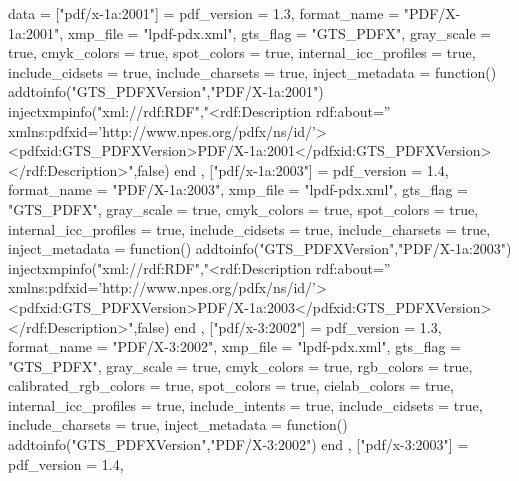 data = {
        ["pdf/x-1a:2001"] = 
        {
            pdf_version             = 1.3,
            format_name             = "PDF/X-1a:2001",
            xmp_file                = "lpdf-pdx.xml",
            gts_flag                = "GTS_PDFX",
            gray_scale              = true,
            cmyk_colors             = true,
            spot_colors             = true,
            internal_icc_profiles   = true,
            include_cidsets         = true,
            include_charsets        = true,
            inject_metadata         = function()
                addtoinfo("GTS_PDFXVersion","PDF/X-1a:2001")
                injectxmpinfo("xml://rdf:RDF","<rdf:Description rdf:about='' xmlns:pdfxid='http://www.npes.org/pdfx/ns/id/'><pdfxid:GTS_PDFXVersion>PDF/X-1a:2001</pdfxid:GTS_PDFXVersion></rdf:Description>",false)
            end
        },
        ["pdf/x-1a:2003"] = 
        {
            pdf_version             = 1.4,
            format_name             = "PDF/X-1a:2003",
            xmp_file                = "lpdf-pdx.xml",
            gts_flag                = "GTS_PDFX",
            gray_scale              = true,
            cmyk_colors             = true,
            spot_colors             = true,
            internal_icc_profiles   = true,
            include_cidsets         = true,
            include_charsets        = true,
            inject_metadata         = function()
                addtoinfo("GTS_PDFXVersion","PDF/X-1a:2003")
                injectxmpinfo("xml://rdf:RDF","<rdf:Description rdf:about='' xmlns:pdfxid='http://www.npes.org/pdfx/ns/id/'><pdfxid:GTS_PDFXVersion>PDF/X-1a:2003</pdfxid:GTS_PDFXVersion></rdf:Description>",false)
            end
        },
        ["pdf/x-3:2002"] = {
            pdf_version             = 1.3,
            format_name             = "PDF/X-3:2002",
            xmp_file                = "lpdf-pdx.xml",
            gts_flag                = "GTS_PDFX",
            gray_scale              = true,
            cmyk_colors             = true,
            rgb_colors              = true,
            calibrated_rgb_colors   = true,
            spot_colors             = true,
            cielab_colors           = true,
            internal_icc_profiles   = true,
            include_intents         = true,
            include_cidsets         = true,
            include_charsets        = true,
            inject_metadata         = function()
                addtoinfo("GTS_PDFXVersion","PDF/X-3:2002")
            end
        },
        ["pdf/x-3:2003"] = {
            pdf_version             = 1.4,
}}
